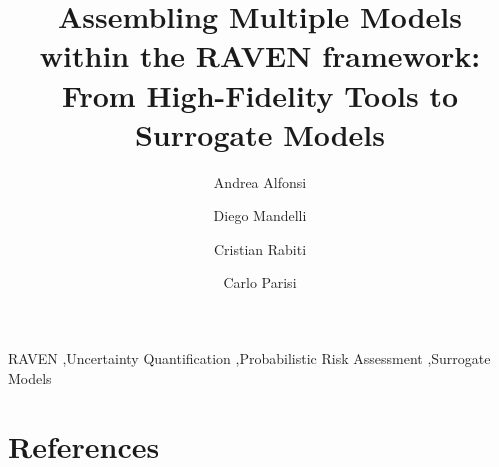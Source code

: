 \documentclass{elsarticle}
\begin{document}
\begin{frontmatter}

\title{Assembling Multiple Models within the RAVEN framework: From High-Fidelity Tools to Surrogate Models}

\author{Andrea Alfonsi}
\address{andrea.alfonsi@inl.gov}

\author{Diego Mandelli}
\address{diego.mandelli@inl.gov}

\author{Cristian Rabiti}
\address{cristian.rabiti@inl.gov}

\author{Carlo Parisi}
\address{carlo.parisi@inl.gov}

\begin{abstract}
  
\end{abstract}

\begin{keyword}
RAVEN \sep Uncertainty Quantification \sep Probabilistic Risk Assessment \sep Surrogate Models 
\end{keyword}

\end{frontmatter}

\linenumbers

\printnomenclature[1in]







\section*{References}


\end{document}
